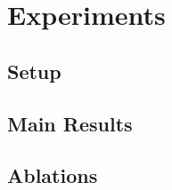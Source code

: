 \section{Experiments}
\label{sec:experiments}


\subsection{Setup}
\label{sec:experiments-setup}


\subsection{Main Results}
\label{sec:experiments-main}

%
% 

\subsection{Ablations}
\label{sec:experiments-ablations}

